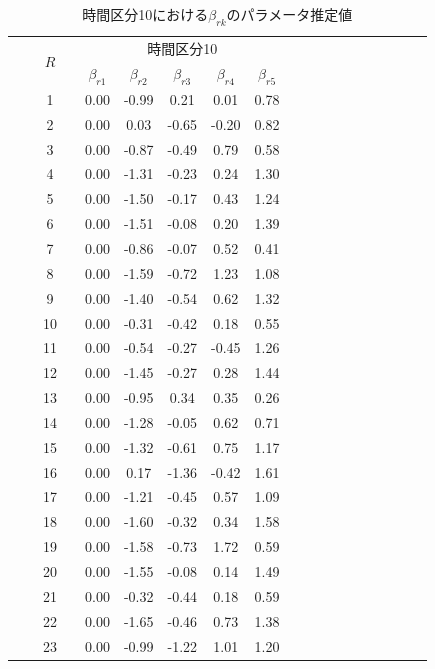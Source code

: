 \documentclass[a4paper，11pt，oneside，openany]{jsbook}
\newcommand{\bhline}[1]{\noalign{\hrule height #1}}
\begin{document}
\begin{table}[h!]
\begin{center}
\caption{時間区分10における$\beta_{rk}$のパラメータ推定値}
\setlength{\tabcolsep}{5.pt}
\begin{tabular}{ccccccccccccccccccc}  
\bhline{1pt}
& & \multirow{2}{*}{$R$} & & \multicolumn{5}{c}{時間区分10}\\
\cline{5-9} 
  & &  &  & $\beta_{r1}$ & $\beta_{r2}$ & $\beta_{r3}$ & $\beta_{r4}$ & $\beta_{r5}$ \\
\bhline{1pt}
 &  & 1  &  & 0.00 & -0.99 & 0.21  & 0.01  & 0.78 \\
 &  & 2  &  & 0.00 & 0.03  & -0.65 & -0.20 & 0.82 \\
 &  & 3  &  & 0.00 & -0.87 & -0.49 & 0.79  & 0.58 \\
 &  & 4  &  & 0.00 & -1.31 & -0.23 & 0.24  & 1.30 \\
 &  & 5  &  & 0.00 & -1.50 & -0.17 & 0.43  & 1.24 \\
 &  & 6  &  & 0.00 & -1.51 & -0.08 & 0.20  & 1.39 \\
 &  & 7  &  & 0.00 & -0.86 & -0.07 & 0.52  & 0.41 \\
 &  & 8  &  & 0.00 & -1.59 & -0.72 & 1.23  & 1.08 \\
 &  & 9  &  & 0.00 & -1.40 & -0.54 & 0.62  & 1.32 \\
 &  & 10 &  & 0.00 & -0.31 & -0.42 & 0.18  & 0.55 \\
 &  & 11 &  & 0.00 & -0.54 & -0.27 & -0.45 & 1.26 \\
 &  & 12 &  & 0.00 & -1.45 & -0.27 & 0.28  & 1.44 \\
 &  & 13 &  & 0.00 & -0.95 & 0.34  & 0.35  & 0.26 \\
 &  & 14 &  & 0.00 & -1.28 & -0.05 & 0.62  & 0.71 \\
 &  & 15 &  & 0.00 & -1.32 & -0.61 & 0.75  & 1.17 \\
 &  & 16 &  & 0.00 & 0.17  & -1.36 & -0.42 & 1.61 \\
 &  & 17 &  & 0.00 & -1.21 & -0.45 & 0.57  & 1.09 \\
 &  & 18 &  & 0.00 & -1.60 & -0.32 & 0.34  & 1.58 \\
 &  & 19 &  & 0.00 & -1.58 & -0.73 & 1.72  & 0.59 \\
 &  & 20 &  & 0.00 & -1.55 & -0.08 & 0.14  & 1.49 \\
 &  & 21 &  & 0.00 & -0.32 & -0.44 & 0.18  & 0.59 \\
 &  & 22 &  & 0.00 & -1.65 & -0.46 & 0.73  & 1.38 \\
 &  & 23 &  & 0.00 & -0.99 & -1.22 & 1.01  & 1.20 \\

\end{tabular}
\end{center}
\end{table}
\end{document}
